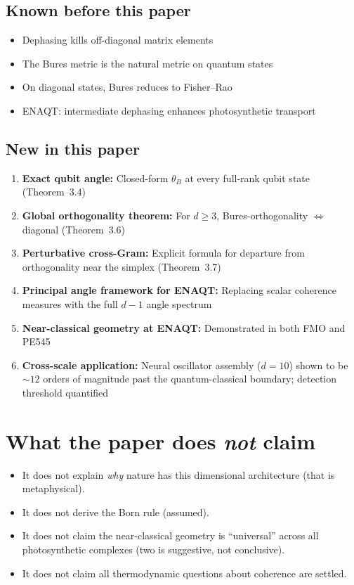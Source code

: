 \documentclass[11pt,a4paper]{article}
\begin{document}
\subsection*{Known before this paper}

\begin{itemize}[leftmargin=1.5em]
\item Dephasing kills off-diagonal matrix elements
\item The Bures metric is the natural metric on quantum states
\item On diagonal states, Bures reduces to Fisher--Rao
\item ENAQT: intermediate dephasing enhances photosynthetic transport
\end{itemize}

\subsection*{New in this paper}

\begin{enumerate}[leftmargin=1.5em]
\item \textbf{Exact qubit angle:} Closed-form $\theta_B$ at every full-rank qubit state (Theorem~3.4)
\item \textbf{Global orthogonality theorem:} For $d \geq 3$, Bures-orthogonality $\iff$ diagonal (Theorem~3.6)
\item \textbf{Perturbative cross-Gram:} Explicit formula for departure from orthogonality near the simplex (Theorem~3.7)
\item \textbf{Principal angle framework for ENAQT:} Replacing scalar coherence measures with the full $d{-}1$ angle spectrum
\item \textbf{Near-classical geometry at ENAQT:} Demonstrated in both FMO and PE545
\item \textbf{Cross-scale application:} Neural oscillator assembly ($d = 10$) shown to be ${\sim}12$ orders of magnitude past the quantum-classical boundary; detection threshold quantified
\end{enumerate}

\section*{What the paper does \emph{not} claim}

\begin{itemize}[leftmargin=1.5em]
\item It does not explain \emph{why} nature has this dimensional architecture (that is metaphysical).
\item It does not derive the Born rule (assumed).
\item It does not claim the near-classical geometry is ``universal'' across all photosynthetic complexes (two is suggestive, not conclusive).
\item It does not claim all thermodynamic questions about coherence are settled.
\end{itemize}
\end{document}
